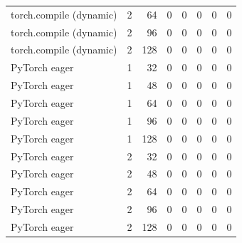 \begin{tabular}{lrrrrrrr}
torch.compile (dynamic) & 2 & 64 & 0 & 0 & 0 & 0 & 0 \\
torch.compile (dynamic) & 2 & 96 & 0 & 0 & 0 & 0 & 0 \\
torch.compile (dynamic) & 2 & 128 & 0 & 0 & 0 & 0 & 0 \\
PyTorch eager & 1 & 32 & 0 & 0 & 0 & 0 & 0 \\
PyTorch eager & 1 & 48 & 0 & 0 & 0 & 0 & 0 \\
PyTorch eager & 1 & 64 & 0 & 0 & 0 & 0 & 0 \\
PyTorch eager & 1 & 96 & 0 & 0 & 0 & 0 & 0 \\
PyTorch eager & 1 & 128 & 0 & 0 & 0 & 0 & 0 \\
PyTorch eager & 2 & 32 & 0 & 0 & 0 & 0 & 0 \\
PyTorch eager & 2 & 48 & 0 & 0 & 0 & 0 & 0 \\
PyTorch eager & 2 & 64 & 0 & 0 & 0 & 0 & 0 \\
PyTorch eager & 2 & 96 & 0 & 0 & 0 & 0 & 0 \\
PyTorch eager & 2 & 128 & 0 & 0 & 0 & 0 & 0 \\
\bottomrule
\end{tabular}
